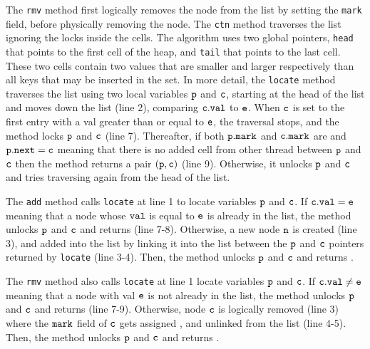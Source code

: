 The {\tt rmv} method first logically removes the node
from the list by setting the {\tt mark} field, before 
physically removing the node.
%
The {\tt ctn} method traverses the list ignoring the locks
inside the cells. The algorithm uses two global pointers, {\tt head} that points to  the first cell of the heap, and {\tt tail} that points to the last cell.  
These two cells contain two values that are smaller 
and larger respectively than all keys that may be                     
inserted in the set. In more detail, the {\tt locate} method traverses the list using two local variables ${\tt p}$ and $\tt c$, starting at the head of the list and moves down the list (line 2), comparing ${\tt c.val}$ to ${\tt e}$. When $\tt c$ is set to the
first entry with a val greater than or equal to $\tt e$, the traversal stops, and the
method locks $\tt p$ and $\tt c$ (line 7). Thereafter, if both $\tt p.mark$ and $\tt c.mark$ are \false \; and ${\tt p.next = c}$ meaning that there is no added cell from other thread between $\tt p$ and $\tt c$ then the method returns a pair $\tt (p,c)$ (line 9). Otherwise, it unlocks $\tt p$ and $\tt c$ and tries traversing again from the head of the list.

The {\tt add} method calls {\tt locate} at line 1 to locate variables $\tt p$ and $\tt c$. If $\tt c.val = e$ meaning that a node whose $\tt val$ is equal to $\tt e$ is already in the list, the method unlocks $\tt p$ and $\tt c$ and returns \false \; (line 7-8). Otherwise, a new node $\tt n$ is created (line 3), and added into the list by linking it into the list between the $\tt p$ and $\tt c$ pointers returned by
{\tt locate} (line 3-4). Then, the method unlocks $\tt p$ and $\tt c$ and returns \true.  

The {\tt rmv} method also calls {\tt locate} at line 1 locate variables $\tt p$ and $\tt c$. If $\tt c.val \neq e$ meaning that a node with val $\tt e$ is not already in the list, the method unlocks $\tt p$ and $\tt c$ and returns \false (line 7-9). Otherwise, node $\tt c$ is logically removed (line 3) where the $\tt mark$ field of $\tt c$ gets assigned \true, and unlinked from the list (line 4-5). Then, the method unlocks $\tt p$ and $\tt c$ and returns \true.  

